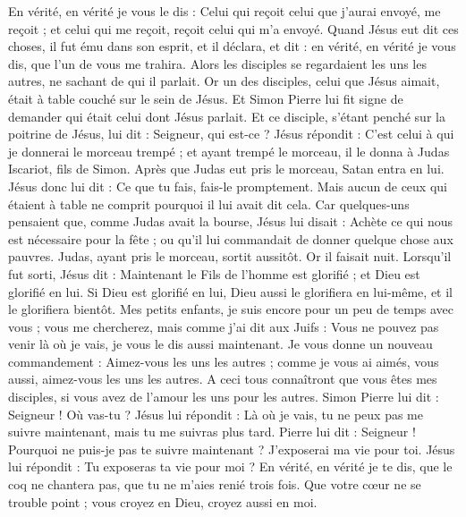 \begin{multicols}{2}
En vérité, en vérité je vous le dis : Celui qui reçoit celui que j'aurai envoyé, me reçoit ; et celui qui me reçoit, reçoit celui qui m'a envoyé.
Quand Jésus eut dit ces choses, il fut ému dans son esprit, et il déclara, et dit : en vérité, en vérité je vous dis, que l'un de vous me trahira.
Alors les disciples se regardaient les uns les autres, ne sachant de qui il parlait.
Or un des disciples, celui que Jésus aimait, était à table couché sur le sein de Jésus.
Et Simon Pierre lui fit signe de demander qui était celui dont Jésus parlait.
Et ce disciple, s'étant penché sur la poitrine de Jésus, lui dit : Seigneur, qui est-ce ?
Jésus répondit : C'est celui à qui je donnerai le morceau trempé ; et ayant trempé le morceau, il le donna à Judas Iscariot, fils de Simon.
Après que Judas eut pris le morceau, Satan entra en lui. Jésus donc lui dit : Ce que tu fais, fais-le promptement.
Mais aucun de ceux qui étaient à table ne comprit pourquoi il lui avait dit cela.
Car quelques-uns pensaient que, comme Judas avait la bourse, Jésus lui disait : Achète ce qui nous est nécessaire pour la fête ; ou qu'il lui commandait de donner quelque chose aux pauvres.
Judas, ayant pris le morceau, sortit aussitôt. Or il faisait nuit.
Lorsqu'il fut sorti, Jésus dit : Maintenant le Fils de l'homme est glorifié ; et Dieu est glorifié en lui.
Si Dieu est glorifié en lui, Dieu aussi le glorifiera en lui-même, et il le glorifiera bientôt.
Mes petits enfants, je suis encore pour un peu de temps avec vous ; vous me chercherez, mais comme j'ai dit aux Juifs : Vous ne pouvez pas venir là où je vais, je vous le dis aussi maintenant.
Je vous donne un nouveau commandement : Aimez-vous les uns les autres ; comme je vous ai aimés, vous aussi, aimez-vous les uns les autres.
A ceci tous connaîtront que vous êtes mes disciples, si vous avez de l'amour les uns pour les autres.
Simon Pierre lui dit : Seigneur ! Où vas-tu ? Jésus lui répondit : Là où je vais, tu ne peux pas me suivre maintenant, mais tu me suivras plus tard.
Pierre lui dit : Seigneur ! Pourquoi ne puis-je pas te suivre maintenant ? J'exposerai ma vie pour toi.
Jésus lui répondit : Tu exposeras ta vie pour moi ? En vérité, en vérité je te dis, que le coq ne chantera pas, que tu ne m'aies renié trois fois.
\VerseOne{}Que votre cœur ne se trouble point ; vous croyez en Dieu, croyez aussi en moi.

\end{multicols}
